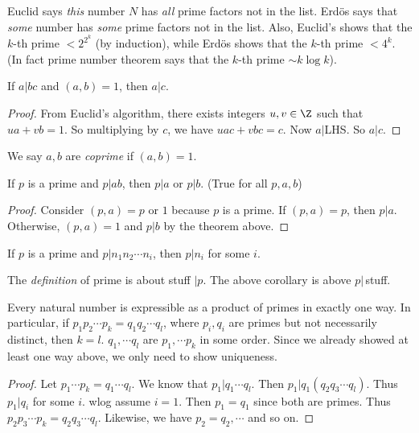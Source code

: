 \documentclass[a4paper]{article}
\begin{document}
  \note Euclid says \emph{this} number $N$ has \emph{all} prime factors not in the list. Erd\"{o}s says that \emph{some} number has \emph{some} prime factors not in the list. Also, Euclid's shows that the $k$-th prime $< 2^{2^k}$ (by induction), while Erd\"{o}s shows that the $k$-th prime $<4^k$. (In fact prime number theorem says that the $k$-th prime $\sim k\log k$).

  \begin{thm}
    If $a| bc$ and $(a, b) = 1$, then $a | c$.
  \end{thm}

  \begin{proof}
    From Euclid's algorithm, there exists integers $u, v\in \Z$ such that $ua + vb = 1$. So multiplying by $c$,  we have $uac + vbc = c$. Now $a | $LHS. So $a | c$.
  \end{proof}

  \begin{defi}
    We say $a, b$ are \emph{coprime} if $(a, b) = 1$. 
  \end{defi}

  \begin{cor}
    If $p$ is a prime and $p|ab$, then $p|a$ or $p|b$. (True for all $p, a, b$)
  \end{cor}

  \begin{proof}
    Consider $(p, a) = p$ or $1$ because $p$ is a prime. If $(p, a) = p$, then $p | a$. Otherwise, $(p, a) = 1$ and $p | b$ by the theorem above.
  \end{proof}

  \begin{cor}
    If $p$ is a prime and $p|n_1n_2\cdots n_i$, then $p | n_i$ for some $i$. 
  \end{cor}

  \note The \emph{definition} of prime is about stuff $ | p$. The above corollary is above $p | $\,stuff.

  \begin{thm}
    Every natural number is expressible as a product of primes in exactly one way. In particular, if $p_1p_2\cdots p_k = q_1q_2\cdots q_l$, where $p_i, q_i$ are primes but not necessarily distinct, then $k = l$. $q_1, \cdots q_l$ are $p_1, \cdots p_k$ in some order. Since we already showed at least one way above, we only need to show uniqueness.
  \end{thm}

  \begin{proof}
    Let $p_1\cdots p_k = q_1\cdots q_l$. We know that $p_1 | q_1\cdots q_l$. Then $p_1 | q_1(q_2q_3\cdots q_l)$. Thus $p_1 | q_i$ for some $i$. wlog assume $i = 1$. Then $p_1 = q_1$ since both are primes. Thus $p_2p_3 \cdots p_k = q_2q_3\cdots q_l$. Likewise, we have $p_2 = q_2, \cdots$ and so on.
  \end{proof}
\end{document}
